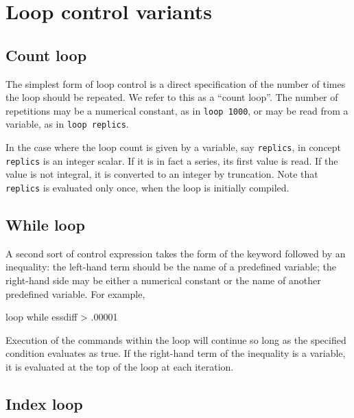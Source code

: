 
\section{Loop control variants}
\label{loop-control}

\subsection{Count loop}
\label{loop-count}

The simplest form of loop control is a direct specification of the
number of times the loop should be repeated.  We refer to this as a
``count loop''.  The number of repetitions may be a numerical
constant, as in \verb+loop 1000+, or may be read from a variable, as
in \verb+loop replics+.

In the case where the loop count is given by a variable, say
\verb+replics+, in concept \verb+replics+ is an integer scalar.  If it
is in fact a series, its first value is read.  If the value is not
integral, it is converted to an integer by truncation.  Note that
\verb+replics+ is evaluated only once, when the loop is initially
compiled.
      

\subsection{While loop}
\label{loop-while}

A second sort of control expression takes the form of the keyword
 followed by an inequality: the left-hand term should be
the name of a predefined variable; the right-hand side may be either a
numerical constant or the name of another predefined variable.  For
example, 
%
\begin{code}
loop while essdiff > .00001
\end{code}

Execution of the commands within the loop will continue so long as the
specified condition evaluates as true. If the right-hand term of the
inequality is a variable, it is evaluated at the top of the loop at
each iteration.

\subsection{Index loop}
\label{loop-index}

